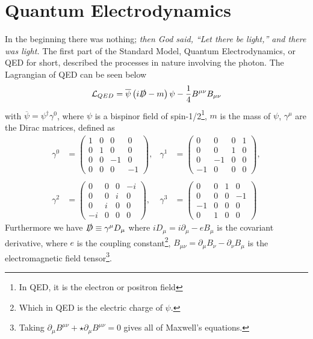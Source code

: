 \documentclass[12pt, a4paper]{book}
\begin{document}
\section{Quantum Electrodynamics}
In the beginning there was nothing; \textit{then God said, “Let there be light,” and there was light.} The first part of the Standard Model, Quantum Electrodynamics, or QED for short, described the processes in nature involving the photon. 
The Lagrangian of QED can be seen below
\begin{equation}\label{eq:QED}
    \mathcal{L}_{QED} = \overline{\psi}\left(i\slashed{D} -m\right)\psi -\frac{1}{4}B^{\mu\nu}B_{\mu\nu}
\end{equation}
with $\overline{\psi}=\psi^\dagger\gamma^0$, where $\psi$ is a bispinor field of spin-1/2\footnote{In QED, it is the electron or positron field}, $m$ is the mass of $\psi$, $\gamma^\mu$ are the Dirac matrices, defined as 
$$
\begin{aligned}
    \gamma ^{0}&={\begin{pmatrix}1&0&0&0\\0&1&0&0\\0&0&-1&0\\0&0&0&-1\end{pmatrix}},&\gamma ^{1}&={\begin{pmatrix}0&0&0&1\\0&0&1&0\\0&-1&0&0\\-1&0&0&0\end{pmatrix}},\\\\
    \gamma ^{2}&={\begin{pmatrix}0&0&0&-i\\0&0&i&0\\0&i&0&0\\-i&0&0&0\end{pmatrix}},&\gamma ^{3}&={\begin{pmatrix}0&0&1&0\\0&0&0&-1\\-1&0&0&0\\0&1&0&0\end{pmatrix}}~
\end{aligned}
$$
Furthermore we have $\slashed{D}\equiv \gamma^\mu D_\mu$ where $iD_\mu = i\partial_\mu -eB_\mu$ is the covariant derivative, where $e$ is the coupling constant\footnote{Which in QED is the electric charge of $\psi$.},
$B_{\mu\nu}=\partial_\mu B_\nu - \partial_\nu B_\mu$ is the electromagnetic field tensor\footnote{Taking $\partial_\mu B^{\mu\nu} + \star \partial_\mu B^{\mu\nu} = 0$ gives all of Maxwell's equations.}. 
\end{document}
